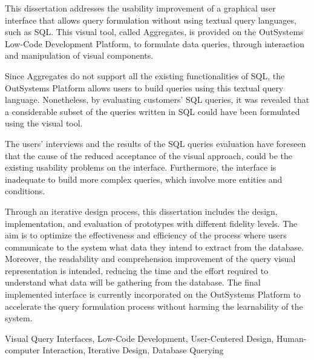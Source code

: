 This dissertation addresses the usability improvement of a graphical user interface that allows query formulation without using textual query languages, such as SQL. This visual tool, called Aggregates, is provided on the OutSystems Low-Code Development Platform, to formulate data queries, through interaction and manipulation of visual components. 

Since Aggregates do not support all the existing functionalities of SQL, the OutSystems Platform allows users to build queries using this textual query language. Nonetheless, by evaluating customers' SQL queries, it was revealed that a considerable subset of the queries written in SQL could have been formulated using the visual tool.

The users' interviews and the results of the SQL queries evaluation have foreseen that the cause of the reduced acceptance of the visual approach, could be the existing usability problems on the interface. Furthermore, the interface is inadequate to build more complex queries, which involve more entities and conditions.

Through an iterative design process, this dissertation includes the design, implementation, and evaluation of prototypes with different fidelity levels. The aim is to optimize the effectiveness and efficiency of the process where users communicate to the system what data they intend to extract from the database. Moreover, the readability and comprehension improvement of the query visual representation is intended, reducing the time and the effort required to understand what data will be gathering from the database. The final implemented interface is currently incorporated on the OutSystems Platform to accelerate the query formulation process without harming the learnability of the system.


\begin{keywords}
Visual Query Interfaces, Low-Code Development, User-Centered Design, Human-computer Interaction, Iterative Design, Database Querying
\end{keywords} 
